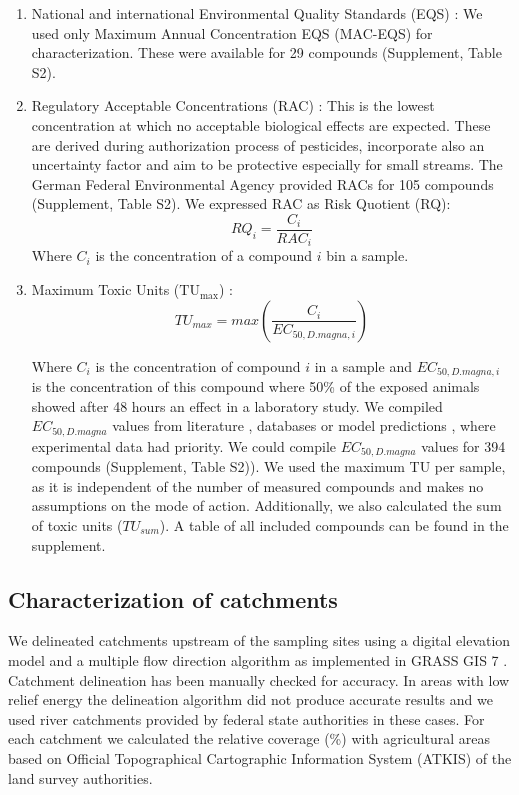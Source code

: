 \documentclass[journal=esthag,manuscript=article]{achemso}
\begin{document}
\begin{enumerate}
  \item National and international Environmental Quality Standards (EQS) \citep{ogewv_verordnung_2011,european_union_directive_2013}:
  We used only Maximum Annual Concentration EQS (MAC-EQS) for characterization.
  These were available for 29 compounds (Supplement, Table S2).

  \item Regulatory Acceptable Concentrations (RAC) \citep{brock_linking_2010}:
  This is the lowest concentration at which no acceptable biological effects are expected. 
  These are derived during authorization process of pesticides, incorporate also an uncertainty factor and aim to be protective especially for small streams.
  The German Federal Environmental Agency provided RACs for 105 compounds (Supplement, Table S2).  
  We expressed RAC as Risk Quotient (RQ):
  \begin{equation}
  RQ_i = \frac{C_i}{RAC_i}
  \end{equation}
  Where $C_i$ is the concentration of a compound $i$ bin a sample.

  \item Maximum Toxic Units ($\mathrm{TU_{max}}$)  \citep{sprague_measurement_1970}: 
  \begin{equation}
  TU_{max} = max(\frac{C_i}{EC_{50, D.magna, i}})
  \end{equation}

  Where $C_i$ is the concentration of compound $i$ in a sample and $EC_{50, D.magna, i}$ is the concentration of this compound where 50\% of the exposed animals showed after 48 hours an effect in a laboratory study.
  We compiled $EC_{50, D.magna}$ values from literature \citep{malaj_organic_2014}, databases \citep{lewis_international_2016,u.s._epa_ecotoxicology_2015} or model predictions \citep{schuurmann_quantitative_2011}, where experimental data had priority.
  We could compile $EC_{50, D.magna}$ values for 394 compounds (Supplement, Table S2)).
  We used the maximum TU per sample, as it is independent of the number of measured compounds and makes no assumptions on the mode of action.
  Additionally, we also calculated the sum of toxic units ($TU_{sum}$).
  A table of all included compounds can be found in the supplement.
\end{enumerate}


\subsection{Characterization of catchments}
We delineated catchments upstream of the sampling sites using a digital elevation model \citep{eea_digital_2013} and a multiple flow direction algorithm \citep{holmgren_multiple_1994} as implemented in GRASS GIS 7 \citep{neteler_grass_2012}.
Catchment delineation has been manually checked for accuracy. 
In areas with low relief energy the delineation algorithm did not produce accurate results and we used river catchments provided by federal state authorities in these cases.
For each catchment we calculated the relative coverage (\%) with agricultural areas based on Official Topographical Cartographic Information System (ATKIS) of the land survey authorities.
\end{document}
